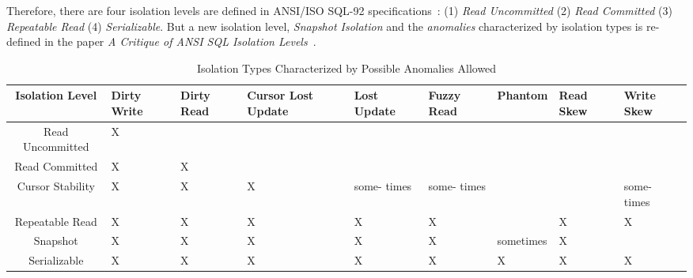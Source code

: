 \noindent Therefore, there are four isolation levels are defined in ANSI/ISO SQL-92 specifications~\cite{ansi1992x3}: (1) \textit{Read Uncommitted} (2) \textit{Read Committed} (3) \textit{Repeatable Read} (4) \textit{Serializable}. But a new isolation level, \textit{Snapshot Isolation} and the \textit{anomalies} characterized by isolation types is re-defined in the paper \textit{A Critique of ANSI SQL Isolation Levels}~\cite{berenson1995critique}.

\begin{table}[h]
	\centering
	\begin{tabular}{|c|p{0.8cm}|p{0.8cm}|p{1.5cm}|p{1cm}|p{1cm}|p{1.8cm}|p{1cm}|p{1cm}|}
		\hline
		\textbf{Isolation Level} & \textbf{Dirty Write} & \textbf{Dirty Read} & \textbf{Cursor Lost Update} & \textbf{Lost Update} & \textbf{Fuzzy Read} & \textbf{Phantom} & \textbf{Read Skew} & \textbf{Write Skew} \\ \hline
		Read Uncommitted         & X                    & \checkmark          & \checkmark                  & \checkmark           & \checkmark          & \checkmark       & \checkmark         & \checkmark          \\ \hline
		Read Committed           & X                    & X                   & \checkmark                  & \checkmark           & \checkmark          & \checkmark       & \checkmark         & \checkmark          \\ \hline
		Cursor Stability         & X                    & X                   & X                           & some- times            & some- times           & \checkmark       & \checkmark         & some- times           \\ \hline
		Repeatable Read          & X                    & X                   & X                           & X                    & X                   & \checkmark       & X                  & X                   \\ \hline
		Snapshot                 & X                    & X                   & X                           & X                    & X                   & sometimes        & X                  & \checkmark          \\ \hline
		Serializable             & X                    & X                   & X                           & X                    & X                   & X                & X                  & X                   \\ \hline
	\end{tabular}
	\caption{Isolation Types Characterized by Possible Anomalies Allowed \protect \cite{berenson1995critique}}
	\label{table:anomaly}
\end{table}

